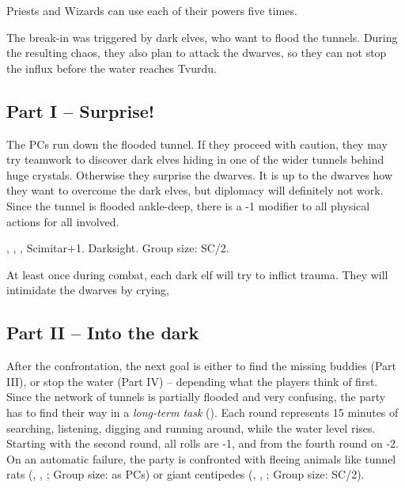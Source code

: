 {		

		\noindent
		Priests and Wizards can use each of their powers five times.


		\noindent
		The break-in was triggered by dark elves, who want to flood the tunnels. During the resulting chaos, they also plan to attack the dwarves, so they can not stop the influx before the water reaches Tvurdu.

		\subsection{Part I -- Surprise!}

		\noindent
		The PCs run down the flooded tunnel. If they proceed with caution, they may try teamwork to discover dark elves hiding in one of the wider tunnels behind huge crystals. Otherwise they surprise the dwarves. It is up to the dwarves how they want to overcome the dark elves, but diplomacy will definitely not work. Since the tunnel is flooded ankle-deep, there is a -1 modifier to all physical actions for all involved.

		 , , , Scimitar+1. Darksight. Group size: SC/2.

		At least once during combat, each dark elf will try to inflict trauma. They will intimidate the dwarves by crying, 

		\subsection{Part II -- Into the dark}

		After the confrontation, the next goal is either to find the missing buddies (Part III), or stop the water (Part IV) -- depending what the players think of first. Since the network of tunnels is partially flooded and very confusing, the party has to find their way in a \emph{long-term task} (). Each round represents 15 minutes of searching, listening, digging and running around, while the water level rises. Starting with the second round, all rolls are -1, and from the fourth round on -2. On an automatic failure, the party is confronted with fleeing animals like tunnel rats (, , ; Group size: as PCs) or giant centipedes (, , ; Group size: SC/2).

}
